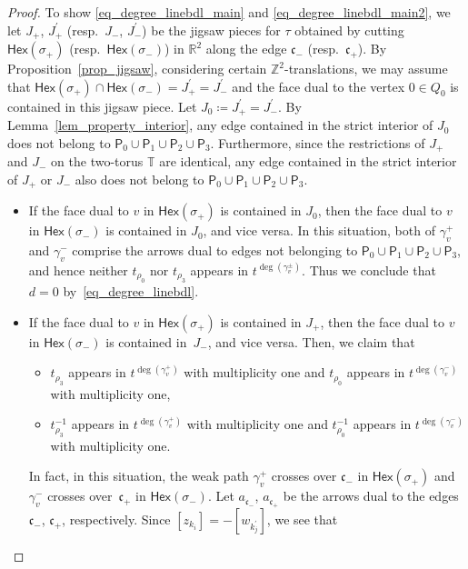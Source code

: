 \documentclass[pdftex]{sigma}
\numberwithin{equation}{section}
\theoremstyle{definition}
\newcommand{\ZZ}{\mathbb{Z}}
\newcommand{\RR}{\mathbb{R}}
\newcommand{\TT}{\mathbb{T}}
\newcommand{\fkc}{\mathfrak{c}}
\newcommand{\sfP}{\mathsf{P}}
\newcommand{\Hex}{\mathsf{Hex}}
\begin{document}
\begin{proof}
To show \eqref{eq_degree_linebdl_main} and \eqref{eq_degree_linebdl_main2},
we let $J_+$, $J_+^\prime$ (resp.\ $J_-$, $J_-^\prime$) be the jigsaw pieces for $\tau$ obtained by cutting
$\Hex(\sigma_+)$ (resp.\ $\Hex(\sigma_-)$) in $\RR^2$ along the edge $\fkc_-$ (resp.\ $\fkc_+$).
By Proposition~\ref{prop_jigsaw}, considering certain $\ZZ^2$-translations, we may assume that
$\Hex(\sigma_+)\cap \Hex(\sigma_-)=J_+^\prime=J_-^\prime$ and the face dual to the vertex $0\in Q_0$ is contained in this jigsaw piece.
Let $J_0\coloneqq J_+^\prime=J_-^\prime$.
By Lemma~\ref{lem_property_interior}, any edge contained in the strict interior of $J_0$ does not belong to $\sfP_0\cup \sfP_1\cup \sfP_2\cup \sfP_3$.
Furthermore, since the restrictions of $J_+$ and $J_-$ on the two-torus $\TT$ are identical,
any edge contained in the strict interior of $J_+$ or $J_-$ also does not belong to $\sfP_0\cup \sfP_1\cup \sfP_2\cup \sfP_3$.
\begin{itemize}\itemsep=0pt
\item If the face dual to $v$ in $\Hex(\sigma_+)$ is contained in $J_0$, then the face dual to $v$ in $\Hex(\sigma_-)$ is contained in $J_0$,
and vice versa.
In this situation, both of $\gamma_v^+$ and $\gamma_v^-$ comprise the arrows dual to edges not belonging to $\sfP_0\cup \sfP_1\cup \sfP_2\cup \sfP_3$,
and hence neither $t_{\rho_0}$ nor $t_{\rho_3}$ appears in $t^{\deg(\gamma_v^\pm)}$.
Thus we conclude that $d=0$ by~\eqref{eq_degree_linebdl}.
\item If the face dual to $v$ in $\Hex(\sigma_+)$ is contained in $J_+$, then the face dual to $v$ in $\Hex(\sigma_-)$ is contained in~$J_-$,
and vice versa. Then, we claim that
\begin{itemize}\setlength{\leftskip}{1cm}\itemsep=0pt
\item[(Case 1)] $t_{\rho_3}$ appears in $t^{\deg(\gamma^+_v)}$ with multiplicity one and $t_{\rho_0}$ appears in $t^{\deg(\gamma^-_v)}$ with multiplicity one,
\item[(Case 2)] $t_{\rho_3}^{-1}$ appears in $t^{\deg(\gamma^+_v)}$ with multiplicity one and $t_{\rho_0}^{-1}$ appears in $t^{\deg(\gamma^-_v)}$ with multiplicity one.
\end{itemize}
In fact, in this situation, the weak path $\gamma_v^+$ crosses over $\fkc_-$ in $\Hex(\sigma_+)$ and $\gamma_v^-$ crosses over~$\fkc_+$ in $\Hex(\sigma_-)$.
Let $a_{\fkc_-}$, $a_{\fkc_+}$ be the arrows dual to the edges $\fkc_-$, $\fkc_+$, respectively.
Since $[z_{k_i}]=-[w_{k^\prime_j}]$, we see that

\end{itemize}
\end{proof}
\end{document}
